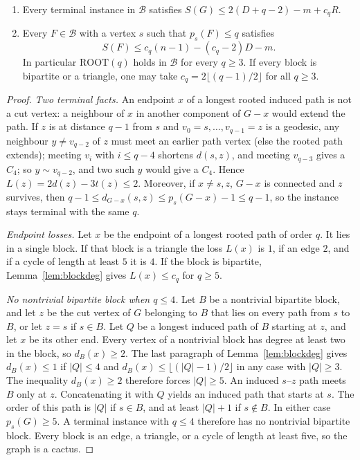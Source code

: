 \documentclass[ASNA]{USG}
\theoremstyle{WBstyletwo}
\numberwithin{equation}{section}
\newcommand{\pp}{p}
\newcommand{\ROOT}{\mathrm{ROOT}}
\begin{document}
\begin{theorem}\label{thm:blocks}
\begin{enumerate}
\item Every terminal instance in $\mathcal B$ satisfies $S(G)\le 2(D+q-2)-m+c_q R$.
\item Every $F\in\mathcal B$ with a vertex $s$ such that $\pp_s(F)\le q$ satisfies
\[
S(F)\le c_q(n-1)-(c_q-2)D-m.
\]
In particular $\ROOT(q)$ holds in $\mathcal B$ for every $q\ge 3$. If every block is bipartite or a triangle, one may take $c_q=2\lfloor(q-1)/2\rfloor$ for all $q\ge 3$.
\end{enumerate}
\end{theorem}

\begin{proof}
\emph{Two terminal facts.} An endpoint $x$ of a longest rooted induced path is not a cut vertex: a neighbour of $x$ in another component of $G-x$ would extend the path. If $z$ is at distance $q-1$ from $s$ and $v_0=s,\dots,v_{q-1}=z$ is a geodesic, any neighbour $y\ne v_{q-2}$ of $z$ must meet an earlier path vertex (else the rooted path extends); meeting $v_i$ with $i\le q-4$ shortens $d(s,z)$, and meeting $v_{q-3}$ gives a $C_4$; so $y\sim v_{q-2}$, and two such $y$ would give a $C_4$. Hence $L(z)=2d(z)-3t(z)\le 2$. Moreover, if $x\ne s,z$, $G-x$ is connected and $z$ survives, then $q-1\le d_{G-x}(s,z)\le\pp_s(G-x)-1\le q-1$, so the instance stays terminal with the same $q$.

\emph{Endpoint losses.} Let $x$ be the endpoint of a longest rooted path of order $q$. It lies in a single block. If that block is a triangle the loss $L(x)$ is $1$, if an edge $2$, and if a cycle of length at least $5$ it is $4$. If the block is bipartite, Lemma~\ref{lem:blockdeg} gives $L(x)\le c_q$ for $q\ge 5$.

\emph{No nontrivial bipartite block when $q\le 4$.} Let $B$ be a nontrivial bipartite block, and let $z$ be the cut vertex of $G$ belonging to $B$ that lies on every path from $s$ to $B$, or let $z=s$ if $s\in B$. Let $Q$ be a longest induced path of $B$ starting at $z$, and let $x$ be its other end. Every vertex of a nontrivial block has degree at least two in the block, so $d_B(x)\ge 2$. The last paragraph of Lemma~\ref{lem:blockdeg} gives $d_B(x)\le 1$ if $|Q|\le 4$ and $d_B(x)\le\lfloor(|Q|-1)/2\rfloor$ in any case with $|Q|\ge 3$. The inequality $d_B(x)\ge 2$ therefore forces $|Q|\ge 5$. An induced $s$--$z$ path meets $B$ only at $z$. Concatenating it with $Q$ yields an induced path that starts at $s$. The order of this path is $|Q|$ if $s\in B$, and at least $|Q|+1$ if $s\notin B$. In either case $\pp_s(G)\ge 5$. A terminal instance with $q\le 4$ therefore has no nontrivial bipartite block. Every block is an edge, a triangle, or a cycle of length at least five, so the graph is a cactus.


\end{proof}
\end{document}
